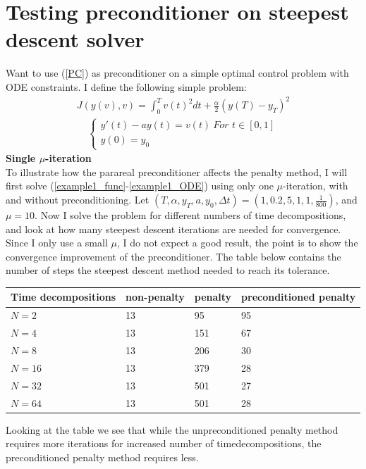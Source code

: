 \documentclass[11pt,a4paper]{article}
\begin{document}
\section{Testing preconditioner on steepest descent solver}
Want to use (\ref{PC}) as preconditioner on a simple optimal control problem with ODE constraints. I define the following simple problem:
\begin{align}
J(y(v),v)=\int_0^T v(t)^2 dt + \frac{\alpha}{2}(y(T)-y_T)^2  \label{example1_func}
\end{align} 
\begin{align}
\left\{
     \begin{array}{lr}
		y'(t) - ay(t) = v(t) \ 	\textit{For $t \in [0,1]$} \\
		y(0)=y_0
	\end{array}
   \right. \label{example1_ODE}
\end{align}
\textbf{Single $\mu$-iteration}
\\
To illustrate how the parareal preconditioner affects the penalty method, I will first solve (\ref{example1_func}-\ref{example1_ODE}) using only one $\mu$-iteration, with and without preconditioning. Let $(T,\alpha,y_T,a,y_0,\Delta t)=(1,0.2,5,1,1,\frac{1}{800})$, and $\mu=10$. Now I solve the problem for different numbers of time decompositions, and look at how many steepest descent iterations are needed for convergence. Since I only use a small $\mu$, I do not expect a good result, the point is to show the convergence improvement of the preconditioner. The table below contains the number of steps the steepest descent method needed to reach its tolerance. 
 \begin{center}
    \begin{tabular}{| l | l | l | l |}
    \hline
     Time decompositions & non-penalty & penalty& preconditioned penalty  \\ \hline
    	$N=2$& 13& 95&  95\\ \hline
    	$N=4$ & 13& 151&67\\ \hline
    	$N=8$ & 13& 206&30\\ \hline
    	$N=16$ & 13& 379&28\\ \hline
    	$N=32$ & 13& 501&27\\ \hline
    	$N=64$ & 13& 501&28\\ \hline
    \end{tabular}
\end{center}
Looking at the table we see that while the unpreconditioned penalty method requires more iterations for increased number of timedecompositions, the preconditioned penalty method requires less.
\end{document}
